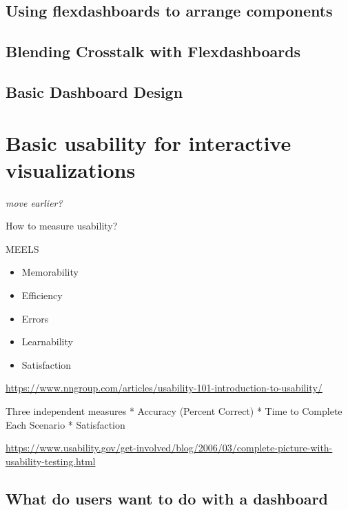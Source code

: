 \documentclass[
]{krantz}
\providecommand{\tightlist}{%
  \setlength{\itemsep}{0pt}\setlength{\parskip}{0pt}}
\begin{document}
\hypertarget{using-flexdashboards-to-arrange-components}{%
\section{Using flexdashboards to arrange components}\label{using-flexdashboards-to-arrange-components}}

\hypertarget{blending-crosstalk-with-flexdashboards}{%
\section{Blending Crosstalk with Flexdashboards}\label{blending-crosstalk-with-flexdashboards}}

\hypertarget{basic-dashboard-design}{%
\section{Basic Dashboard Design}\label{basic-dashboard-design}}

\hypertarget{usability-for-visualizations}{%
\chapter{Basic usability for interactive visualizations}\label{usability-for-visualizations}}

\emph{move earlier?}

How to measure usability?

MEELS

\begin{itemize}
\tightlist
\item
  Memorability
\item
  Efficiency
\item
  Errors
\item
  Learnability
\item
  Satisfaction
\end{itemize}

\url{https://www.nngroup.com/articles/usability-101-introduction-to-usability/}

Three independent measures
* Accuracy (Percent Correct)
* Time to Complete Each Scenario
* Satisfaction

\url{https://www.usability.gov/get-involved/blog/2006/03/complete-picture-with-usability-testing.html}

\hypertarget{what-do-users-want-to-do-with-a-dashboard}{%
\section{What do users want to do with a dashboard}\label{what-do-users-want-to-do-with-a-dashboard}}
\end{document}
